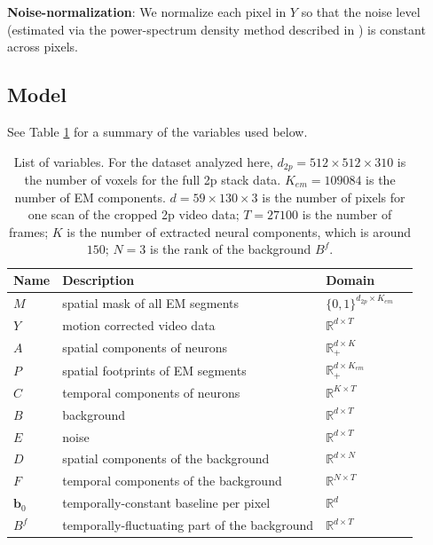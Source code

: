 \documentclass[10pt,letterpaper]{article}
\begin{document}
{\noindent\textbf{Noise-normalization}: We normalize each pixel in $Y$ so that the noise level (estimated via the power-spectrum density method described in \citep{Pnevmatikakis2016}) is constant across pixels. 



\subsection{Model}
See Table \ref{table:variables} for a summary of the variables used below. \\

\begin{table}
\centering 
\begin{tabular}{llll}
\toprule
\cmidrule{1-2}
Name & Description & Domain \\
\midrule
$M$ & spatial mask of all EM segments & $\{0, 1\}^{d_{2p}\times K_{em}}$\\
$Y$ & motion corrected video data & $\mathbb{R}^{d\times T}$\\
$A$ & spatial components of neurons & $\mathbb{R}_+^{d\times K}$\\
$P$ & spatial footprints of EM segments& $\mathbb{R}_+^{d\times K_{em}}$\\
$C$ & temporal components of neurons&$\mathbb{R}^{K\times T}$ \\
$B$ & background & $\mathbb{R}^{d\times T}$\\
$E$ & noise  & $\mathbb{R}^{d\times T}$\\
$D$ & spatial components of the background &$ \mathbb{R}^{d\times N}$\\
$F$ & temporal components of the background & $\mathbb{R}^{N\times T}$\\
$\bm{b}_0$ & temporally-constant baseline per pixel &$ \mathbb{R}^{d} $\\
$B^f$ & temporally-fluctuating part of the background &$ \mathbb{R}^{d \times T} $\\
\bottomrule
\end{tabular}
\caption{List of variables.  For the dataset analyzed here, $d_{2p}=512\times 512\times 310$ is the number of voxels for the full 2p stack data. $K_{em}=109084$ is the number of EM components. $d=59\times 130\times 3$ is the number of pixels for one scan of the cropped 2p video data; $T=27100$ is the number of frames; $K$ is the number of extracted neural components, which is around $150$; $N=3$ is the rank of the background $B^f$.}
\label{table:variables}
\end{table}

}
\end{document}
